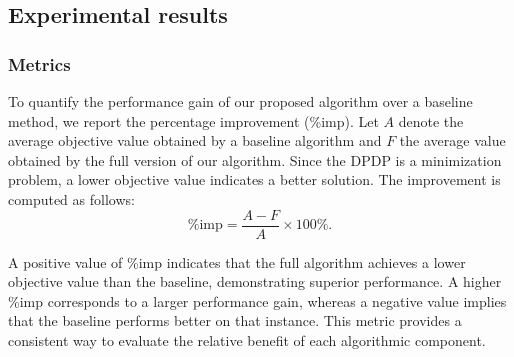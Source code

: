 \documentclass[]{interact}
\begin{document}





\subsection{Experimental results}
\subsubsection{Metrics}
To quantify the performance gain of our proposed algorithm over a baseline method, we report the percentage improvement (\%imp). Let $A$ denote the average objective value obtained by a baseline algorithm and $F$ the average value obtained by the full version of our algorithm. Since the DPDP is a minimization problem, a lower objective value indicates a better solution. The improvement is computed as follows:
\[
\text{\%imp} = \frac{A - F}{A} \times 100\%.
\]

A positive value of \%imp indicates that the full algorithm achieves a lower objective value than the baseline, demonstrating superior performance. A higher \%imp corresponds to a larger performance gain, whereas a negative value implies that the baseline performs better on that instance. This metric provides a consistent way to evaluate the relative benefit of each algorithmic component.
\end{document}
